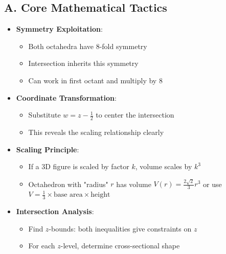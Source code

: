 \documentclass[11pt]{article}
\begin{document}
\begin{tacticalbox}
\subsection*{A. Core Mathematical Tactics}
\begin{itemize}[leftmargin=*]
    \item \textbf{Symmetry Exploitation}: 
    \begin{itemize}
        \item Both octahedra have 8-fold symmetry
        \item Intersection inherits this symmetry
        \item Can work in first octant and multiply by 8
    \end{itemize}
    \item \textbf{Coordinate Transformation}: 
    \begin{itemize}
        \item Substitute $w = z - \frac{1}{2}$ to center the intersection
        \item This reveals the scaling relationship clearly
    \end{itemize}
    \item \textbf{Scaling Principle}: 
    \begin{itemize}
        \item If a 3D figure is scaled by factor $k$, volume scales by $k^3$
        \item Octahedron with "radius" $r$ has volume $V(r) = \frac{2\sqrt{2}}{3}r^3$ or use $V = \frac{1}{3} \times \text{base area} \times \text{height}$
    \end{itemize}
    \item \textbf{Intersection Analysis}: 
    \begin{itemize}
        \item Find $z$-bounds: both inequalities give constraints on $z$
        \item For each $z$-level, determine cross-sectional shape
    \end{itemize}
\end{itemize}


\end{tacticalbox}
\end{document}
